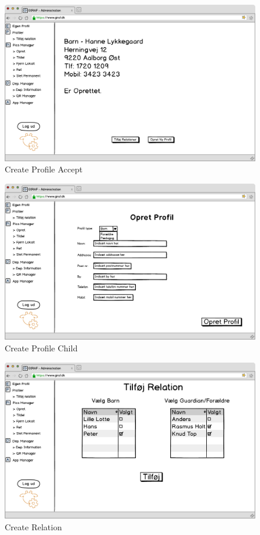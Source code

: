 \begin{figure}[!h]
\centering
\includegraphics[width=1\textwidth]{images/mockup/opretProfilAccept.png}
\caption{Create Profile Accept}
\label{fig:create_profile_accept}
\end{figure}



\begin{figure}[!h]
\centering
\includegraphics[width=1\textwidth]{images/mockup/opretProfilBarn.png}
\caption{Create Profile Child}
\label{fig:create_profile_child}
\end{figure}

\newpage

\begin{figure}[!h]
\centering
\includegraphics[width=1\textwidth]{images/mockup/opretRelation.png}
\caption{Create Relation}
\label{fig:create_relation}
\end{figure}

